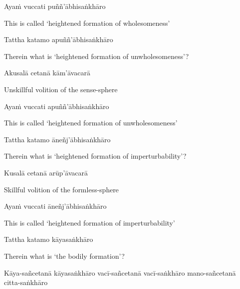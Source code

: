 Ayaṁ vuccati puññ'ābhisaṅkhāro

\begin{english}
  This is called `heightened formation of wholesomeness'
\end{english}

Tattha katamo apuññ'ābhisaṅkhāro

\begin{english}
  Therein what is `heightened formation of unwholesomeness'?
\end{english}

Akusalā cetanā kām'āvacarā

\begin{english}
  Unskillful volition of the sense-sphere
\end{english}

Ayaṁ vuccati apuññ'ābhisaṅkhāro

\begin{english}
  This is called `heightened formation of unwholesomeness'
\end{english}

Tattha katamo āneñj'ābhisaṅkhāro

\begin{english}
  Therein what is `heightened formation of imperturbability'?
\end{english}

Kusalā cetanā arūp'āvacarā

\begin{english}
  Skillful volition of the formless-sphere
\end{english}

Ayaṁ vuccati āneñj'ābhisaṅkhāro

\begin{english}
  This is called `heightened formation of imperturbability'
\end{english}

Tattha katamo kāyasaṅkhāro

\begin{english}
  Therein what is `the bodily formation'?
\end{english}

\begin{pali-hang}
  Kāya-sañcetanā kāyasaṅkhāro vacī-sañcetanā vacī-saṅkhāro mano-sañcetanā citta-saṅkhāro\makeatletter\hyperlink{endnote78-appendix}\makeatother
\end{pali-hang}

